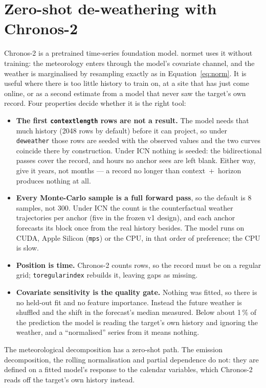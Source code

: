 \documentclass[11pt]{report}
\newcommand{\nosep}{\setlength{\itemsep}{0pt}\setlength{\parskip}{0pt}\setlength{\topsep}{2pt}}
\newcommand{\nm}{\textsf{normet}}
\newcommand{\codeunderscore}{\textunderscore\allowbreak}
\newcommand{\code}[1]{\texttt{\let\_\codeunderscore #1}}
\begin{document}
\section{Zero-shot de-weathering with Chronos-2}\label{sec:chronos}
Chronos-2 is a pretrained time-series foundation model. \nm{} uses it without training:
the meteorology enters through the model's covariate channel, and the weather is
marginalised by resampling exactly as in Equation~\eqref{eq:norm}. It is useful where
there is too little history to train on, at a site that has just come online, or as a
second estimate from a model that never saw the target's own record. Four properties
decide whether it is the right tool:
\begin{itemize}\nosep
  \item \textbf{The first \code{context\_length} rows are not a result.} The model needs
        that much history (2048 rows by default) before it can project, so under
        \code{deweather} those rows are seeded with the observed values and the two
        curves coincide there by construction. Under ICN nothing is seeded: the
        bidirectional passes cover the record, and hours no anchor sees are left blank.
        Either way, give it years, not months --- a record no longer than
        context~+~horizon produces nothing at all.
  \item \textbf{Every Monte-Carlo sample is a full forward pass}, so the default is 8
        samples, not 300. Under ICN the count is the counterfactual weather trajectories
        per anchor (five in the frozen v1 design), and each anchor forecasts its block
        once from the real history besides. The model runs on CUDA, Apple Silicon
        (\code{mps}) or the CPU, in that order of preference; the CPU is slow.
  \item \textbf{Position is time.} Chronos-2 counts rows, so the record must be on a
        regular grid; \code{to\_regular\_index} rebuilds it, leaving gaps as missing.
  \item \textbf{Covariate sensitivity is the quality gate.} Nothing was fitted, so there
        is no held-out fit and no feature importance. Instead the future weather is
        shuffled and the shift in the forecast's median measured. Below about 1\,\% of
        the prediction the model is reading the target's own history and ignoring the
        weather, and a ``normalised'' series from it means nothing.
\end{itemize}
The meteorological decomposition has a zero-shot path. The emission decomposition, the
rolling normalisation and partial dependence do not: they are defined on a fitted
model's response to the calendar variables, which Chronos-2 reads off the target's own
history instead.
\end{document}
